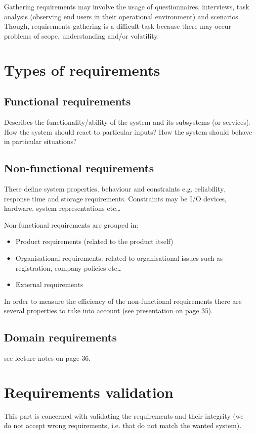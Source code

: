 \documentclass{article}
\begin{document}
	Gathering requirements may involve the usage of questionnaires, interviews, task analysis (observing
	end users in their operational environment) and scenarios.
	Though, requirements gathering is a difficult task because there may occur problems of scope,
	understanding and/or volatility.
	
	\section{Types of requirements}	
	\subsection*{Functional requirements}	
	Describes the functionality/ability of the system and its subsystems (or services).
	How the system should react to particular inputs?	How the system should behave in particular
	situations?
	
	\subsection*{Non-functional requirements}	
	These define system properties, behaviour and constraints e.g. reliability, response time and
	storage requirements. Constraints may be I/O devices, hardware, system representations etc\ldots	
	
	Non-functional requirements are grouped in:
	\begin{itemize}
		\item Product requirements (related to the product itself)
		\item Organisational requirements: related to organisational issues such as registration, company
		policies etc\ldots
		\item External requirements
	\end{itemize}		
	
	In order to measure the efficiency of the non-functional requirements there are several properties
	to take into account (see presentation on page 35).	
	
	\subsection*{Domain requirements}
	see lecture notes on page 36.
	
	\section{Requirements validation}
	This part is concerned with validating the requirements and their integrity (we do not accept wrong
	requirements, i.e. that do not match the wanted system).
	
\end{document}
